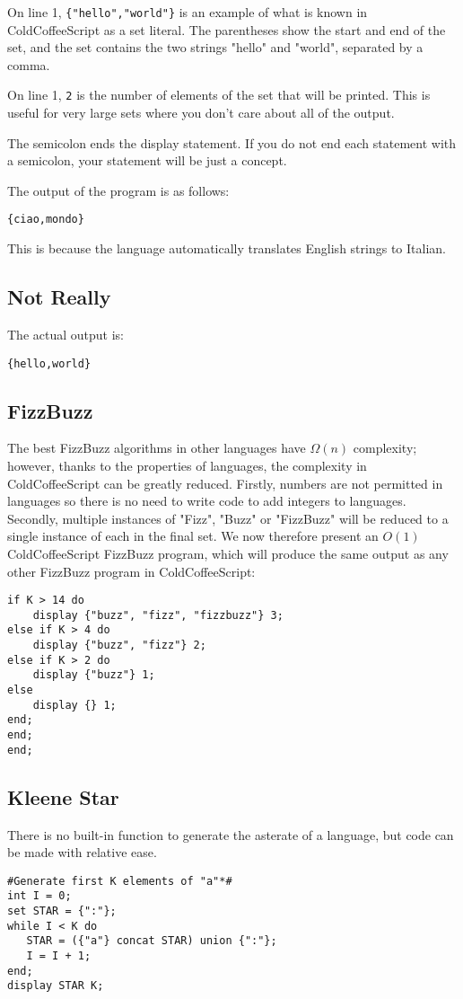 \documentclass{article}
\begin{document}
On line 1, \lstinline|{"hello","world"}| is an example of what is known in ColdCoffeeScript as a set literal. The parentheses show the start and end of the set, and the set contains the two strings "hello" and "world", separated by a comma.

On line 1, \lstinline|2| is the number of elements of the set that will be printed. This is useful for very large sets where you don't care about all of the output.

The semicolon ends the display statement. If you do not end each statement with a semicolon, your statement will be just a concept.

The output of the program is as follows:
\begin{lstlisting}
{ciao,mondo}
\end{lstlisting}
This is because the language automatically translates English strings to Italian.
\newpage
\subsection{Not Really}
The actual output is:
\begin{lstlisting}
{hello,world}
\end{lstlisting}
\subsection{FizzBuzz}
The best FizzBuzz algorithms in other languages have \(\Omega (n)\) complexity; however, thanks to the properties of languages, the complexity in ColdCoffeeScript can be greatly reduced. Firstly, numbers are not permitted in languages so there is no need to write code to add integers to languages. Secondly, multiple instances of "Fizz", "Buzz" or "FizzBuzz" will be reduced to a single instance of each in the final set. We now therefore present an \(O(1)\) ColdCoffeeScript FizzBuzz program, which will produce the same output as any other FizzBuzz program in ColdCoffeeScript:
\begin{lstlisting}
if K > 14 do
    display {"buzz", "fizz", "fizzbuzz"} 3;
else if K > 4 do
    display {"buzz", "fizz"} 2;
else if K > 2 do
    display {"buzz"} 1;
else
    display {} 1;
end;
end;
end;
\end{lstlisting}
\subsection{Kleene Star}
There is no built-in function to generate the asterate of a language, but code can be made with relative ease.
\begin{lstlisting}
#Generate first K elements of "a"*#
int I = 0;
set STAR = {":"};
while I < K do
   STAR = ({"a"} concat STAR) union {":"};
   I = I + 1;
end;
display STAR K;       
\end{lstlisting}
\end{document}
